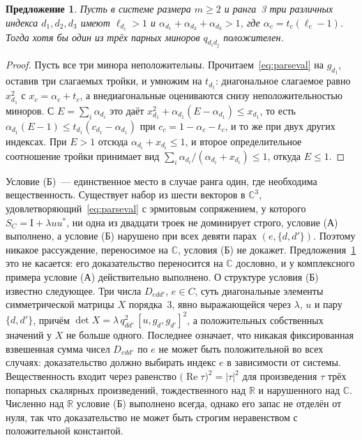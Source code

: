 \documentclass[11pt,a4paper]{article}
\theoremstyle{plain}
\newtheorem{proposition}[theorem]{Предложение}
\theoremstyle{definition}
\theoremstyle{remark}
\newcommand{\RR}{\mathbb{R}}
\newcommand{\CC}{\mathbb{C}}
\newcommand{\Id}{\mathrm{I}}
\begin{document}
\begin{proposition}\label{prop:Aproved}
Пусть в системе размера $m\ge2$ и ранга~3 три различных индекса
$d_1,d_2,d_3$ имеют $\ell_{d_i}>1$ и
$\alpha_{d_1}+\alpha_{d_2}+\alpha_{d_3}>1$, где $\alpha_c=t_c(\ell_c-1)$.
Тогда хотя бы один из трёх парных миноров $q_{d_id_j}$ положителен.
\end{proposition}
\begin{proof}
Пусть все три минора неположительны. Прочитаем~\eqref{eq:parseval} на $g_{d_1}$,
оставив три слагаемых тройки, и умножим на $t_{d_1}$: диагональное слагаемое
равно $x_{d_1}^2$ с $x_c=\alpha_c+t_c$, а внедиагональные оцениваются снизу
неположительностью миноров. С $E=\sum_i\alpha_{d_i}$ это даёт
$x_{d_1}^2+\alpha_{d_1}(E-\alpha_{d_1})\le x_{d_1}$, то есть
$\alpha_{d_1}(E-1)\le t_{d_1}(c_{d_1}-\alpha_{d_1})$ при $c_c=1-\alpha_c-t_c$, и
то же при двух других индексах. При $E>1$ отсюда $\alpha_{d_i}+x_{d_i}\le1$, и
второе определительное соотношение тройки принимает вид
$\sum_i\alpha_{d_i}/(\alpha_{d_i}+x_{d_i})\le1$, откуда $E\le1$.
\end{proof}

Условие (Б)~--- единственное место в случае ранга один, где необходима
вещественность. Существует набор из шести векторов в $\CC^3$,
удовлетворяющий~\eqref{eq:parseval} с эрмитовым сопряжением, у которого
$S_C=\Id+\lambda uu^*$, ни одна из двадцати троек не доминирует строго,
условие (А) выполнено, а условие (Б) нарушено при всех девяти парах
$(e,\{d,d'\})$. Поэтому никакое рассуждение, переносимое на $\CC$, условия
(Б) не докажет. Предложения~\ref{prop:Aproved} это не касается: его
доказательство переносится на $\CC$ дословно, и у комплексного примера условие
(А) действительно выполнено.
О структуре условия (Б) известно следующее. Три числа
$D_{edd'}$, $e\in C$, суть диагональные элементы симметрической матрицы $X$
порядка~3, явно выражающейся через $\lambda$, $u$ и пару $\{d,d'\}$, причём
$\det X=\lambda\,q_{dd'}^2\,[u,g_d,g_{d'}]^2$, а положительных собственных
значений у $X$ не больше одного. Последнее означает, что никакая фиксированная
взвешенная сумма чисел $D_{edd'}$ по $e$ не может быть положительной во всех
случаях: доказательство должно выбирать индекс $e$ в зависимости от системы.
Вещественность входит через равенство
$\bigl(\operatorname{Re}\tau\bigr)^2=|\tau|^2$ для произведения $\tau$ трёх
попарных скалярных произведений, тождественного над $\RR$ и нарушенного над
$\CC$. Численно над $\RR$ условие (Б) выполнено всегда, однако его запас не
отделён от нуля, так что доказательство не может быть строгим неравенством с
положительной константой.
\end{document}
